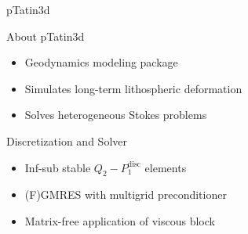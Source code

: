 



\begin{frame}{pTatin3d}

  \begin{block}{About pTatin3d}
  \begin{itemize}
   \item Geodynamics modeling package
   \item Simulates long-term lithospheric deformation
   \item Solves heterogeneous Stokes problems
  \end{itemize}
  \end{block}

  \begin{block}{Discretization and Solver}
  \begin{itemize}
   \item Inf-sub stable $Q_2-P_1^{\mathrm{disc}}$ elements
   \item (F)GMRES with multigrid preconditioner
   \item Matrix-free application of viscous block
  \end{itemize}
  \end{block}

\end{frame}


